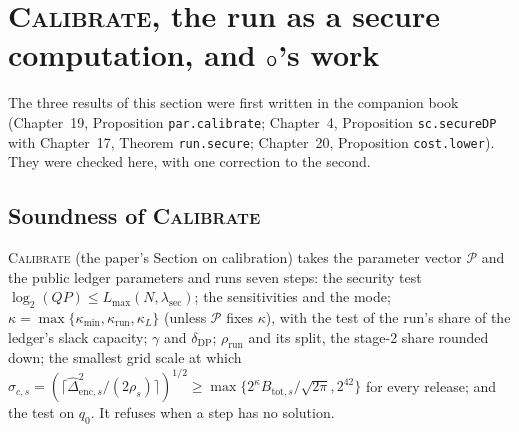 \section{\textsc{Calibrate}, the run as a secure computation, and $\mathsf{O}$'s work}
\label{sec:calib}

The three results of this section were first written in the companion book (Chapter~19, Proposition \texttt{par.calibrate}; Chapter~4, Proposition \texttt{sc.secureDP} with Chapter~17, Theorem \texttt{run.secure}; Chapter~20, Proposition \texttt{cost.lower}). They were checked here, with one correction to the second.

\subsection{Soundness of \textsc{Calibrate}}

\textsc{Calibrate} (the paper's Section on calibration) takes the parameter vector $\mathcal P$ and the public ledger parameters and runs seven steps: the security test $\log_2(QP)\le L_{\max}(N,\lambda_{\mathrm{sec}})$; the sensitivities and the mode; $\kappa=\max\{\kappa_{\min},\kappa_{\mathrm{run}},\kappa_L\}$ (unless $\mathcal P$ fixes $\kappa$), with the test of the run's share of the ledger's slack capacity; $\gamma$ and $\delta_{\mathrm{DP}}$; $\rho_{\mathrm{run}}$ and its split, the stage-2 share rounded down; the smallest grid scale at which $\sigma_{c,s}=(\lceil\widehat\Delta_{\mathrm{enc},s}^2/(2\rho_s)\rceil)^{1/2}\ge\max\{2^\kappa B_{\mathrm{tot},s}/\sqrt{2\pi},2^{42}\}$ for every release; and the test on $q_0$. It refuses when a step has no solution.

